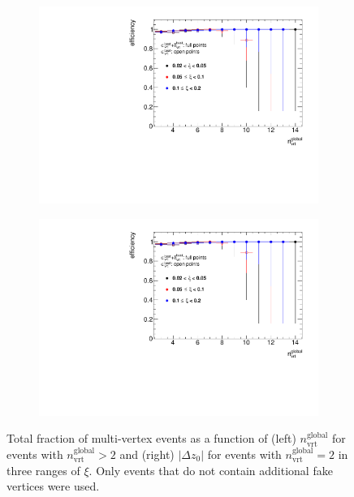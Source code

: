 \begin{figure}[b!]
	\centering
	\begin{subfigure}{.49\textwidth}
		\includegraphics[width=\textwidth,page=2]{chapters/chrgSTAR/img/vertex/vertexEffi_ksi_noFake.pdf}
	\end{subfigure}
	\begin{subfigure}{.49\textwidth}
		\includegraphics[width=\textwidth,page=9]{chapters/chrgSTAR/img/vertex/vertexEffi_ksi_noFake.pdf}
	\end{subfigure}
	\vspace{-0.2cm}
	\caption{Total fraction of multi-vertex events as a function of (left) $n_\textrm{vrt}^\textrm{global}$ for events with $n^\textrm{global}_\textrm{vrt}>2$ and (right) $|\Delta z_0|$ for events with $n^\textrm{global}_\textrm{vrt}=2$  in three ranges of $\xi$. Only events that do not contain additional fake vertices were used. }
	\label{fig:vertexVetoDZ_noFake}
\end{figure}

\FloatBarrier
